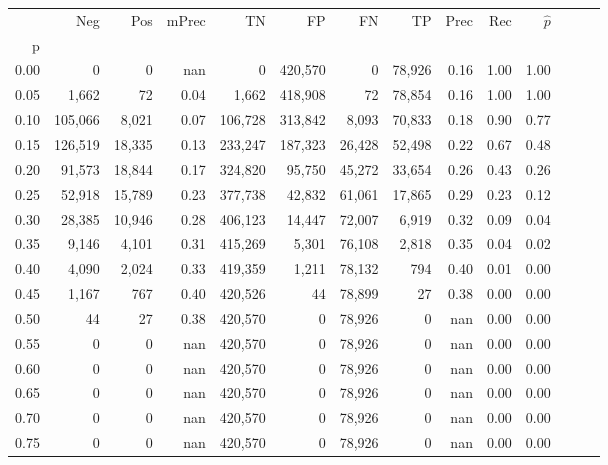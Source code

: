 \begin{tabular}{rrrrrrrrrrrrrr}
\toprule
{} &      Neg &     Pos & mPrec &       TN &       FP &      FN &      TP &  Prec &   Rec & $\hat{p}$ \\
p    &          &         &       &          &          &         &         &       &       &           \\
\midrule
0.00 &        0 &       0 &   nan &        0 &  420,570 &       0 &  78,926 &  0.16 &  1.00 &      1.00 \\
0.05 &    1,662 &      72 &  0.04 &    1,662 &  418,908 &      72 &  78,854 &  0.16 &  1.00 &      1.00 \\
0.10 &  105,066 &   8,021 &  0.07 &  106,728 &  313,842 &   8,093 &  70,833 &  0.18 &  0.90 &      0.77 \\
0.15 &  126,519 &  18,335 &  0.13 &  233,247 &  187,323 &  26,428 &  52,498 &  0.22 &  0.67 &      0.48 \\
0.20 &   91,573 &  18,844 &  0.17 &  324,820 &   95,750 &  45,272 &  33,654 &  0.26 &  0.43 &      0.26 \\
0.25 &   52,918 &  15,789 &  0.23 &  377,738 &   42,832 &  61,061 &  17,865 &  0.29 &  0.23 &      0.12 \\
0.30 &   28,385 &  10,946 &  0.28 &  406,123 &   14,447 &  72,007 &   6,919 &  0.32 &  0.09 &      0.04 \\
0.35 &    9,146 &   4,101 &  0.31 &  415,269 &    5,301 &  76,108 &   2,818 &  0.35 &  0.04 &      0.02 \\
0.40 &    4,090 &   2,024 &  0.33 &  419,359 &    1,211 &  78,132 &     794 &  0.40 &  0.01 &      0.00 \\
0.45 &    1,167 &     767 &  0.40 &  420,526 &       44 &  78,899 &      27 &  0.38 &  0.00 &      0.00 \\
0.50 &       44 &      27 &  0.38 &  420,570 &        0 &  78,926 &       0 &   nan &  0.00 &      0.00 \\
0.55 &        0 &       0 &   nan &  420,570 &        0 &  78,926 &       0 &   nan &  0.00 &      0.00 \\
0.60 &        0 &       0 &   nan &  420,570 &        0 &  78,926 &       0 &   nan &  0.00 &      0.00 \\
0.65 &        0 &       0 &   nan &  420,570 &        0 &  78,926 &       0 &   nan &  0.00 &      0.00 \\
0.70 &        0 &       0 &   nan &  420,570 &        0 &  78,926 &       0 &   nan &  0.00 &      0.00 \\
0.75 &        0 &       0 &   nan &  420,570 &        0 &  78,926 &       0 &   nan &  0.00 &      0.00 \\

\end{tabular}
